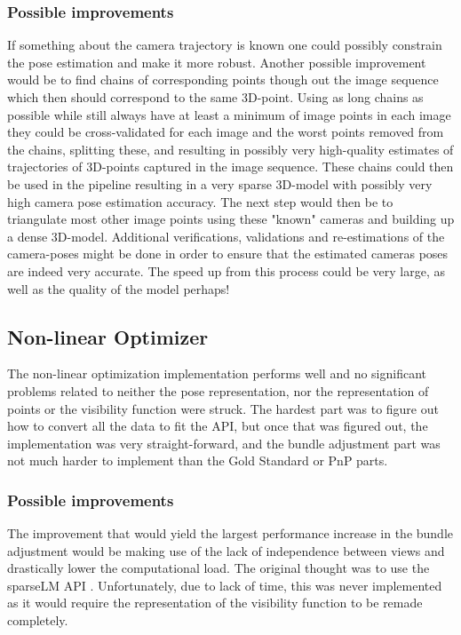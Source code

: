 \subsubsection{Possible improvements}
If something about the camera trajectory is known one could possibly constrain the pose estimation and make it more robust.
Another possible improvement would be to find chains of corresponding points though out the image sequence which then should correspond to the same 3D-point. Using as long chains as possible while still always have at least a minimum of image points in each image they could be cross-validated for each image and the worst points removed from the chains, splitting these, and resulting in possibly very high-quality estimates of trajectories of 3D-points captured in the image sequence. These chains could then be used in the pipeline resulting in a very sparse 3D-model with possibly very high camera pose estimation accuracy. The next step would then be to triangulate most other image points using these "known" cameras and building up a dense 3D-model. Additional verifications, validations and re-estimations of the camera-poses might be done in order to ensure that the estimated cameras poses are indeed very accurate. The speed up from this process could be very large, as well as the quality of the model perhaps!

\subsection{Non-linear Optimizer}
The non-linear optimization implementation performs well and no significant problems related to neither the pose representation, nor the representation of points or the visibility function were struck. The hardest part was to figure out how to convert all the data to fit the API, but once that was figured out, the implementation was very straight-forward, and the bundle adjustment part was not much harder to implement than the Gold Standard or PnP parts.

\subsubsection{Possible improvements}
The improvement that would yield the largest performance increase in the bundle adjustment would be making use of the lack of independence between views and drastically lower the computational load. The original thought was to use the sparseLM API \cite{sparseLM}. Unfortunately, due to lack of time, this was never implemented as it would require the representation of the visibility function to be remade completely. 

